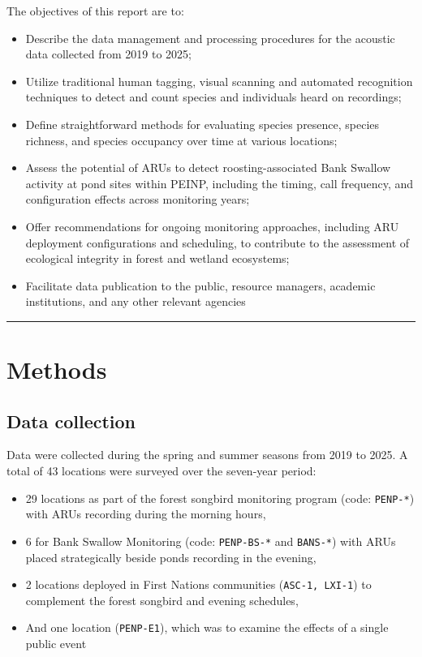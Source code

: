 \documentclass[
  letterpaper,
  DIV=11,
  numbers=noendperiod]{scrartcl}
\providecommand{\tightlist}{%
  \setlength{\itemsep}{0pt}\setlength{\parskip}{0pt}}
\begin{document}
The objectives of this report are to:

\begin{itemize}
\tightlist
\item
  Describe the data management and processing procedures for the
  acoustic data collected from 2019 to 2025;
\item
  Utilize traditional human tagging, visual scanning and automated
  recognition techniques to detect and count species and individuals
  heard on recordings;
\item
  Define straightforward methods for evaluating species presence,
  species richness, and species occupancy over time at various
  locations;
\item
  Assess the potential of ARUs to detect roosting-associated Bank
  Swallow activity at pond sites within PEINP, including the timing,
  call frequency, and configuration effects across monitoring years;
\item
  Offer recommendations for ongoing monitoring approaches, including ARU
  deployment configurations and scheduling, to contribute to the
  assessment of ecological integrity in forest and wetland ecosystems;
\item
  Facilitate data publication to the public, resource managers, academic
  institutions, and any other relevant agencies
\end{itemize}

\begin{center}\rule{0.5\linewidth}{0.5pt}\end{center}

\section{Methods}\label{methods}

\subsection{Data collection}\label{data-collection}

Data were collected during the spring and summer seasons from 2019 to
2025. A total of 43 locations were surveyed over the seven-year period:

\begin{itemize}
\tightlist
\item
  29 locations as part of the forest songbird monitoring program (code:
  \texttt{PENP-*}) with ARUs recording during the morning hours,
\item
  6 for Bank Swallow Monitoring (code: \texttt{PENP-BS-*} and
  \texttt{BANS-*}) with ARUs placed strategically beside ponds recording
  in the evening,
\item
  2 locations deployed in First Nations communities
  (\texttt{ASC-1,\ LXI-1}) to complement the forest songbird and evening
  schedules,
\item
  And one location (\texttt{PENP-E1}), which was to examine the effects
  of a single public event
\end{itemize}
\end{document}
